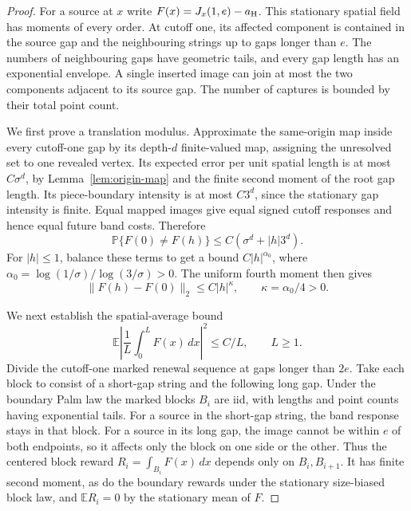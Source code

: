 \documentclass[11pt,letterpaper]{article}
\newcommand{\PP}{\mathbb P}\newcommand{\EE}{\mathbb E}
\begin{document}
\begin{proof}
For a source at $x$ write $F(x)=J_x(1,e)-a_{\rm H}$.
This stationary spatial field has moments of every order.
At cutoff one, its affected component is contained in the source
gap and the neighbouring strings up to gaps longer than $e$.
The numbers of neighbouring gaps have geometric tails, and every
gap length has an exponential envelope. A single inserted image
can join at most the two components adjacent to its source gap.
The number of captures is bounded by their total point count.

We first prove a translation modulus. Approximate the same-origin
map inside every cutoff-one gap by its depth-$d$ finite-valued
map, assigning the unresolved set to one revealed vertex.
Its expected error per unit spatial length is at most
$C\sigma^d$, by Lemma~\ref{lem:origin-map} and the finite second
moment of the root gap length. Its piece-boundary intensity is at
most $C3^d$, since the stationary gap intensity is finite.
Equal mapped images give equal signed cutoff responses and hence
equal future band costs. Therefore
\[
 \PP\{F(0)\ne F(h)\}\le C(\sigma^d+|h|3^d).
\]
For $|h|\le1$, balance these terms to get a bound $C|h|^{\alpha_0}$,
where $\alpha_0=\log(1/\sigma)/\log(3/\sigma)>0$.
The uniform fourth moment then gives
\begin{equation}\label{eq:line-band-translation-modulus}
 \|F(h)-F(0)\|_2\le C|h|^\kappa,
                         \qquad\kappa=\alpha_0/4>0.
\end{equation}

We next establish the spatial-average bound
\begin{equation}\label{eq:line-band-spatial-average}
 \EE\left|\frac1L\int_0^L F(x)\,dx\right|^2\le C/L,
                                      \qquad L\ge1.
\end{equation}
Divide the cutoff-one marked renewal sequence at gaps longer than
$2e$. Take each block to consist of a short-gap string and the
following long gap. Under the boundary Palm law the marked blocks
$B_i$ are iid, with lengths and point counts having exponential
tails. For a source in the short-gap string, the band response
stays in that block. For a source in its long gap, the image cannot
be within $e$ of both endpoints, so it affects only the block on
one side or the other. Thus the centered block reward
$R_i=\int_{B_i}F(x)\,dx$ depends only on $B_i,B_{i+1}$.
It has finite second moment, as do the boundary rewards under the
stationary size-biased block law, and $\EE R_i=0$ by the stationary
mean of $F$.


\end{proof}
\end{document}
